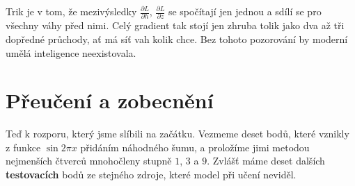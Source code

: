 Trik je v tom, že mezivýsledky $\frac{\partial L}{\partial h}$, $\frac{\partial L}{\partial z}$ se spočítají jen jednou a sdílí se pro všechny váhy před nimi. Celý gradient tak stojí jen zhruba tolik jako dva až tři dopředné průchody, ať má síť vah kolik chce. Bez tohoto pozorování by moderní umělá inteligence neexistovala.

\section{Přeučení a zobecnění}

Teď k rozporu, který jsme slíbili na začátku. Vezmeme deset bodů, které vznikly z funkce $\sin 2\pi x$ přidáním náhodného šumu, a proložíme jimi metodou nejmenších čtverců mnohočleny stupně $1$, $3$ a $9$. Zvlášť máme deset dalších \textbf{testovacích} bodů ze stejného zdroje, které model při učení neviděl.


